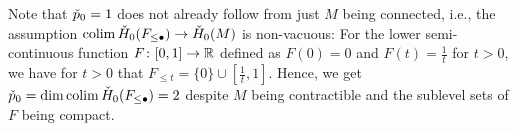 \begin{rem}
    Note that $\check{p}_0 = 1$ does not already follow from just $M$ being connected, i.e., the assumption $\operatorname*{colim} \check{H}_0(F_{\leq \bullet}) \to \check{H}_0(M)$ is non-vacuous:
	For the lower semi-continuous function $F \colon [0,1] \to \mathbb{R}$ defined as $F(0) = 0$ and $F(t) = \frac1t$ for $t > 0$, we have for $t > 0$ that $F_{\leq t} = \{0\} \cup [\frac1t, 1]$.
	Hence, we get $\check{p}_0 = \dim \operatorname*{colim} \check{H}_0(F_{\leq \bullet}) = 2$ despite $M$ being contractible and the sublevel sets of $F$ being compact. %






\end{rem}
